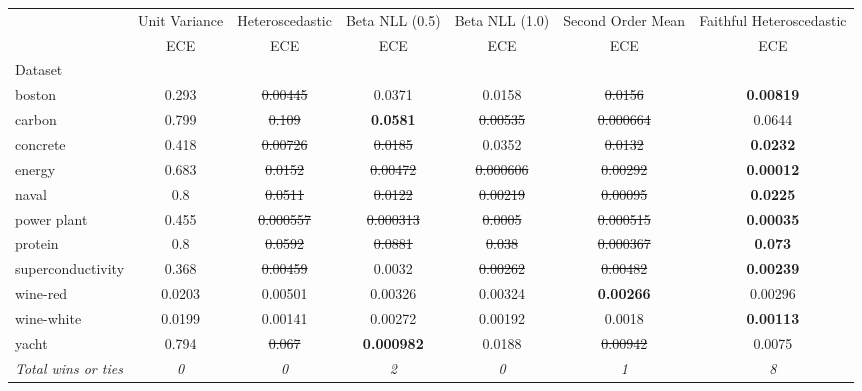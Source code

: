 \begin{tabular}{l|c|c|c|c|c|c}
\toprule
{} & {Unit Variance} & {Heteroscedastic} & {Beta NLL (0.5)} & {Beta NLL (1.0)} & {Second Order Mean} & {Faithful Heteroscedastic} \\
{} & {ECE} & {ECE} & {ECE} & {ECE} & {ECE} & {ECE} \\
{Dataset} & {} & {} & {} & {} & {} & {} \\
\midrule
boston & 0.293 & \sout{0.00445} & 0.0371 & 0.0158 & \sout{0.0156} & \textbf{0.00819} \\
carbon & 0.799 & \sout{0.109} & \textbf{0.0581} & \sout{0.00535} & \sout{0.000664} & 0.0644 \\
concrete & 0.418 & \sout{0.00726} & \sout{0.0185} & 0.0352 & \sout{0.0132} & \textbf{0.0232} \\
energy & 0.683 & \sout{0.0152} & \sout{0.00472} & \sout{0.000606} & \sout{0.00292} & \textbf{0.00012} \\
naval & 0.8 & \sout{0.0511} & \sout{0.0122} & \sout{0.00219} & \sout{0.00095} & \textbf{0.0225} \\
power plant & 0.455 & \sout{0.000557} & \sout{0.000313} & \sout{0.0005} & \sout{0.000515} & \textbf{0.00035} \\
protein & 0.8 & \sout{0.0592} & \sout{0.0881} & \sout{0.038} & \sout{0.000367} & \textbf{0.073} \\
superconductivity & 0.368 & \sout{0.00459} & 0.0032 & \sout{0.00262} & \sout{0.00482} & \textbf{0.00239} \\
wine-red & 0.0203 & 0.00501 & 0.00326 & 0.00324 & \textbf{0.00266} & 0.00296 \\
wine-white & 0.0199 & 0.00141 & 0.00272 & 0.00192 & 0.0018 & \textbf{0.00113} \\
yacht & 0.794 & \sout{0.067} & \textbf{0.000982} & 0.0188 & \sout{0.00942} & 0.0075 \\
\textit{{Total wins or ties}} & \textit{0} & \textit{0} & \textit{2} & \textit{0} & \textit{1} & \textit{8} \\
\bottomrule
\end{tabular}

